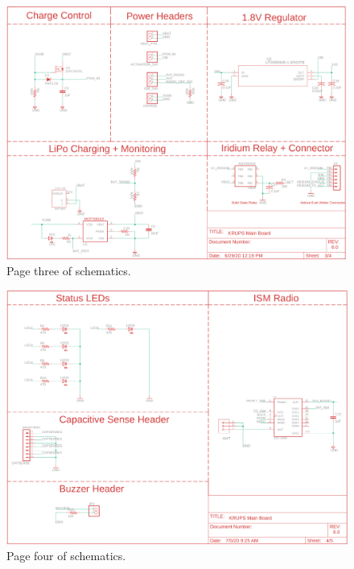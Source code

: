 \documentclass{article}
\begin{document}
\begin{figure}[H]
    \centering
    \includegraphics[width=\textwidth]{images/page3.png}
    \caption{Page three of schematics.}
    \label{fig:page1-3}
\end{figure}

\begin{figure}[H]
    \centering
    \includegraphics[width=\textwidth]{images/page4.png}
    \caption{Page four of schematics.}
    \label{fig:page1-4}
\end{figure}
\end{document}
